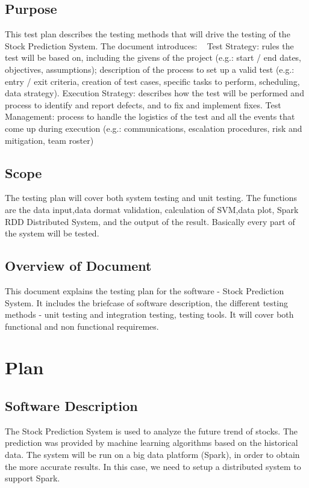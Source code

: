 \documentclass[12pt, titlepage]{article}
\begin{document}
\subsection{Purpose}
This test plan describes the testing methods that will drive the testing of the Stock Prediction System.  The document introduces:
~\newline
	Test Strategy: rules the test will be based on, including the givens of the project (e.g.: start / end dates, objectives, assumptions); description of the process to set up a valid test (e.g.: entry / exit criteria, creation of test cases, specific tasks to perform, scheduling, data strategy).
	Execution Strategy: describes how the test will be performed and process to identify and report defects, and to fix and implement fixes.
	Test Management: process to handle the logistics of the test and all the events that come up during execution (e.g.: communications, escalation procedures, risk and mitigation, team roster)\\
\subsection{Scope}
The testing plan will cover both system testing and unit testing. The functions are the data input,data dormat validation, calculation of SVM,data plot,  Spark RDD Distributed System, and the output of the result. Basically every part of the system will be tested.
\subsection{Overview of Document}
This document explains the testing plan for the software - Stock Prediction System. It includes the briefcase of software description, the different testing methods - unit testing and integration testing, testing tools. It will cover both functional and non functional requiremes.
\section{Plan}
	
\subsection{Software Description}
The Stock Prediction System is used to analyze the future trend of stocks. The prediction was provided by machine learning algorithms based on the historical data. 
The system will be run on a big data platform (Spark), in order to obtain the more accurate results. In this case, we need to setup a distributed system to support Spark.
\end{document}
